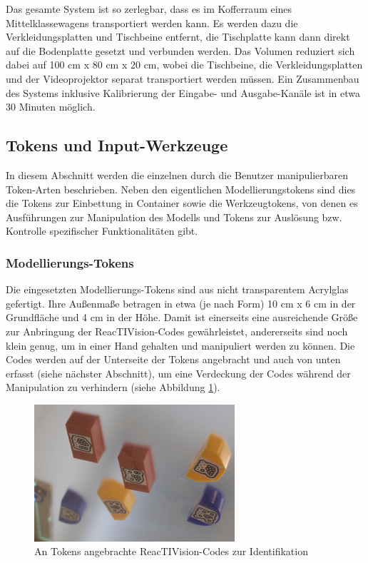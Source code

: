Das gesamte System ist so zerlegbar, dass es im Kofferraum eines Mittelklassewagens transportiert werden kann. Es werden dazu die Verkleidungsplatten und Tischbeine entfernt, die Tischplatte kann dann direkt auf die Bodenplatte gesetzt und verbunden werden. Das Volumen reduziert sich dabei auf 100 cm x 80 cm x 20 cm, wobei die Tischbeine, die Verkleidungsplatten und der Videoprojektor separat transportiert werden müssen. Ein Zusammenbau des Systems inklusive {K}alibrierung der Eingabe- und Ausgabe-Kanäle ist in etwa 30 Minuten möglich.


\subsection{Tokens und Input-Werkzeuge} %
\label{sub:tokens_&_input_werkzeuge}

In diesem Abschnitt werden die einzelnen durch die Benutzer manipulierbaren Token-Arten beschrieben. Neben den eigentlichen Modellierungstokens sind dies die Tokens zur Einbettung in Container sowie die Werkzeugtokens, von denen es Ausführungen zur Manipulation des Modells und Tokens zur Auslösung bzw. Kontrolle spezifischer Funktionalitäten gibt.

\subsubsection{Modellierungs-Tokens} %
\label{subs:modellierungs_tokens}

Die eingesetzten Modellierungs-Tokens sind aus nicht transparentem Acrylglas gefertigt. Ihre Außenmaße betragen in etwa (je nach Form) 10 cm x 6 cm in der Grundfläche und 4 cm in der Höhe. Damit ist einerseits eine ausreichende Größe zur Anbringung der ReacTIVision-Codes gewährleistet, andererseits sind noch klein genug, um in einer Hand gehalten und manipuliert werden zu können. Die Codes werden auf der Unterseite der Tokens angebracht und auch von unten erfasst (siehe nächster Abschnitt), um eine Verdeckung der Codes während der Manipulation zu verhindern (siehe Abbildung \ref{fig:img_ImplementierungInput_TokensCodes}).

\begin{figure}[htbp]
	\centering
		\includegraphics[height=2in]{img/ImplementierungInput/TokensCodes.jpg}
	\caption{An Tokens angebrachte ReacTIVision-Codes zur Identifikation}
	\label{fig:img_ImplementierungInput_TokensCodes}
\end{figure}


